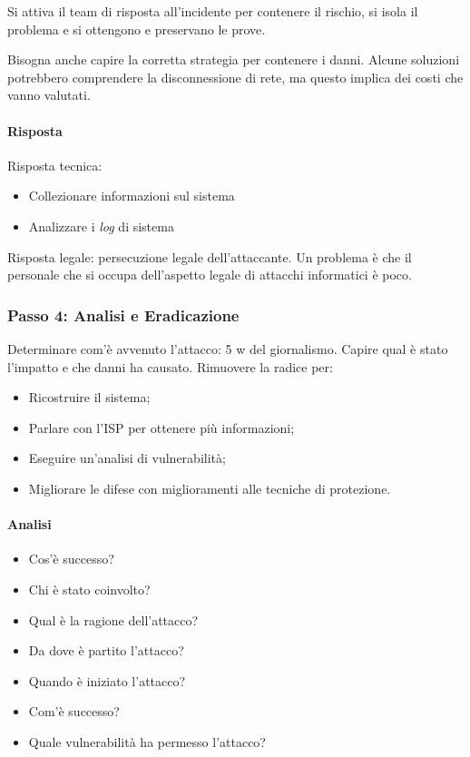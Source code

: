 Si attiva il team di risposta all'incidente per contenere il rischio, si
isola il problema e si ottengono e preservano le prove.

Bisogna anche capire la corretta strategia per contenere i danni. Alcune
soluzioni potrebbero comprendere la disconnessione di rete, ma questo implica
dei costi che vanno valutati.

\paragraph*{Risposta}

Risposta tecnica:
\begin{itemize}
\item Collezionare informazioni sul sistema
\item Analizzare i \textit{log} di sistema
\end{itemize}

Risposta legale: persecuzione legale dell'attaccante. Un problema è
che il personale che si occupa dell'aspetto legale di attacchi informatici è
poco.

\subsubsection{Passo 4: Analisi e Eradicazione}

Determinare com'è avvenuto l'attacco: 5 w del giornalismo. Capire qual è stato
l'impatto e che danni ha causato. Rimuovere la radice per:

\begin{itemize}
\item Ricostruire il sistema;
\item Parlare con l'ISP per ottenere più informazioni;
\item Eseguire un'analisi di vulnerabilità;
\item Migliorare le difese con miglioramenti alle tecniche di protezione.
\end{itemize}

\paragraph*{Analisi}

\begin{itemize}
\item Cos'è successo?
\item Chi è stato coinvolto?
\item Qual è la ragione dell'attacco?
\item Da dove è partito l'attacco?
\item Quando è iniziato l'attacco?
\item Com'è successo?
\item Quale vulnerabilità ha permesso l'attacco?
\end{itemize}


